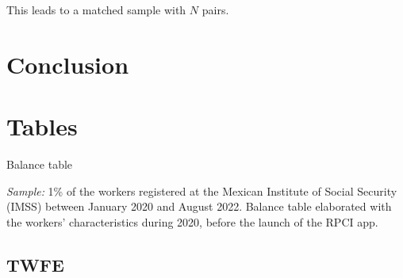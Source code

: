 \documentclass[oneside,11pt]{article}
\begin{document}
This leads to a matched sample with $N$ pairs.

\section{Conclusion} \label{conclusion}



\newpage



\clearpage

%
%
%






\clearpage
\singlespacing

\section{Tables}

\begin{table}[H]
    \caption{Balance table}
    \label{balance_1}
    \begin{center}
    \scriptsize{}
    \end{center}
\end{table}

\scriptsize{
\noindent \textit{Sample:} 1\% of the workers registered at the Mexican Institute of Social Security (IMSS) between January 2020 and August 2022. Balance table elaborated with the workers' characteristics during 2020, before the launch of the RPCI app.
}

\clearpage

\subsection{TWFE}
\end{document}
